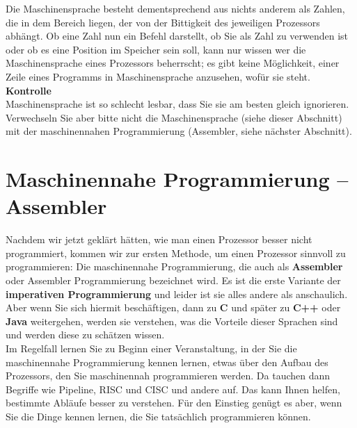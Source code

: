 Die Maschinensprache besteht dementsprechend aus nichts anderem als Zahlen, die in dem Bereich liegen, der von der Bittigkeit des jeweiligen Prozessors abhängt. Ob eine Zahl nun ein Befehl darstellt, ob Sie als Zahl zu verwenden ist oder ob es eine Position im Speicher sein soll, kann nur wissen wer die Maschinensprache eines Prozessors beherrscht; es gibt keine Möglichkeit, einer Zeile eines Programms in Maschinensprache anzusehen, wofür sie steht.\\

\textbf{Kontrolle}\\
Maschinensprache ist so schlecht lesbar, dass Sie sie am besten gleich ignorieren. Verwechseln Sie aber bitte nicht die Maschinensprache (siehe dieser Abschnitt) mit der maschinennahen Programmierung (Assembler, siehe nächster Abschnitt).

\section{Maschinennahe Programmierung – Assembler}

Nachdem wir jetzt geklärt hätten, wie man einen Prozessor besser nicht programmiert, kommen wir zur ersten Methode, um einen Prozessor sinnvoll zu programmieren: Die maschinennahe Programmierung, die auch als \textbf{Assembler} oder Assembler Programmierung bezeichnet wird. Es ist die erste Variante der \textbf{imperativen Programmierung} und leider ist sie alles andere als anschaulich. Aber wenn Sie sich hiermit beschäftigen, dann zu \textbf{C} und später zu \textbf{C++} oder \textbf{Java} weitergehen, werden sie verstehen, was die Vorteile dieser Sprachen sind und werden diese zu schätzen wissen.\\

Im Regelfall lernen Sie zu Beginn einer Veranstaltung, in der Sie die maschinennahe Programmierung kennen lernen, etwas über den Aufbau des Prozessors, den Sie maschinennah programmieren werden. Da tauchen dann Begriffe wie Pipeline, RISC und CISC und andere auf. Das kann Ihnen helfen, bestimmte Abläufe besser zu verstehen. Für den Einstieg genügt es aber, wenn Sie die Dinge kennen lernen, die Sie tatsächlich programmieren können.\\

